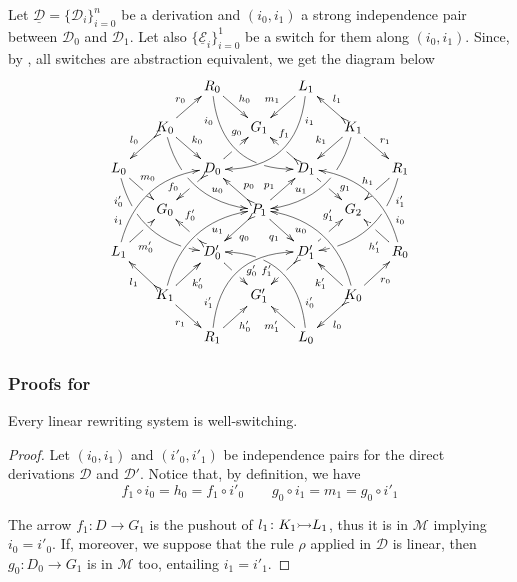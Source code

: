 \documentclass[a4paper,UKenglish,cleveref,pdftex,thm-restate,numberwithinsect]{lipics-v2021}
\newcommand{\mto}[0]{\scalebox{1}{$\rightarrowtail$}}
\newcommand{\dder}[1]{\mathscr{#1}}
\newcommand{\der}[1]{\underline{\dder{#1}}}
\begin{document}
\begin{remark}\label{rem:fill} Let $\der{D}=\{\dder{D}_i\}_{i=0}^n$ be a derivation and $(i_0, i_1)$ a strong independence pair between $\dder{D}_0$ and $\dder{D}_1$. Let also $\{\der{E}_{i}\}_{i=0}^1$ be a switch for them along $(i_0, i_1)$. Since, by , all switches are abstraction equivalent, we get the diagram below
	\[\xymatrix@C=15pt@R=15pt{&&R_0 \ar@/_.8cm/[ddrr]_(.2){i_0}|(.7)\hole
		\ar[dr]^{h_0}&& L_1\ar@/^.8cm/[ddll]^(.2){i_1}
		\ar[dl]_{m_1}\\&K_0\ar[dr]^{k_0}\ar@{>->}[dl]_{l_0}
		\ar@/_.6cm/[ddrr]|(.36)\hole^(.65){u_0}\ar[ur]^{r_0}&& G_1 &&
		K_1
		\ar@/^.6cm/[ddll]|(.36)\hole_(.65){u_1}\ar[dl]_{k_1}\ar@{>->}[lu]_{l_1}
		\ar[dr]^{r_1}\\L_0
		\ar@/_.6cm/[ddrr]_(.2){i'_0}|(.31)\hole|(.81)\hole
		\ar[dr]^(.4){m_0}|(.61)\hole && D_0
		\ar@{>->}[dl]|(.4)\hole_(.65){f_0}\ar[ur]|(.5)\hole^(.7){g_0}&&D_1
		\ar[dr]|(.4)\hole^(.65){g_1}
		\ar@{>->}[ul]|(.5)\hole_(.65){f_1}&&R_1\ar@/^.6cm/[ddll]^(.2){i'_1}|(.31)\hole|(.81)\hole\ar[dl]_{h_1}|(.6)\hole\\&G_0
		&&P_1\ar[dr]_{q_1}	\ar@{>->}[dl]^{q_0}\ar[ur]^(.4){p_1}\ar@{>->}[ul]_(.4){p_0}&&G_2\\L_1	\ar@/^.6cm/[uurr]^(.2){i_1} \ar[ur]_(.35){m'_0}|(.61)\hole && D'_0	\ar@{>->}[ul]|(.4)\hole_(.65){f'_0}\ar[dr]|(.5)\hole^(.65){g'_0}	&&D'_1\ar[ur]|(.4)\hole^(.65){g'_1} \ar@{>->}[dl]|(.5)\hole_(.65){f'_1}	&& R_0 \ar[ul]^(.35){h'_1}|(.61)\hole\ar@/_.6cm/[uull]_(.2){i_0}\\ &K_1	\ar[ur]_{k'_0} \ar[dr]_{r_1}	\ar@{>->}[ul]^{l_1}\ar@/^.6cm/[uurr]_(.65){u_1}&&G'_1&& K_0\ar[ur]_{r_0} \ar[ul]^{k'_1} \ar@{>->}[dl]^{l_0} \ar@/_.6cm/[uull]^(.65){u_0}\\&& R_1	\ar[ur]_{h'_0}\ar@/^.8cm/[uurr]^(.2){i'_1}&& L_0 \ar[ul]^{m'_1} \ar@/_.8cm/[uull]_(.2){i'_0} |(.69)\hole }\] 

\end{remark}


\subsubsection{Proofs for }

\begin{proposition}\label{pr:weak} Every linear rewriting system is well-switching.
\end{proposition}
\begin{proof}
	
	Let $(i_0, i_1)$ and $(i'_0, i'_1)$ be independence pairs for the
	direct derivations $\dder{D}$ and $\dder{D}'$. Notice that, by
	definition, we have
	\[
	f_1\circ i_0=h_0=f_1\circ i'_0 \qquad g_0\circ i_1=m_1= g_0\circ i'_1
	\]
	
	The arrow $f_1\colon D\to G_1$ is the pushout of
	$l_1\colon K_1\mto L_1$, thus it is in $\mathcal{M}$ implying
	$i_0=i'_0$. If, moreover, we suppose that the rule $\rho$ applied in
	$\dder{D}$ is linear, then $g_0\colon D_0\to G_1$ is in
	$\mathcal{M}$ too, entailing $i_1=i'_1$.
\end{proof}
\end{document}
